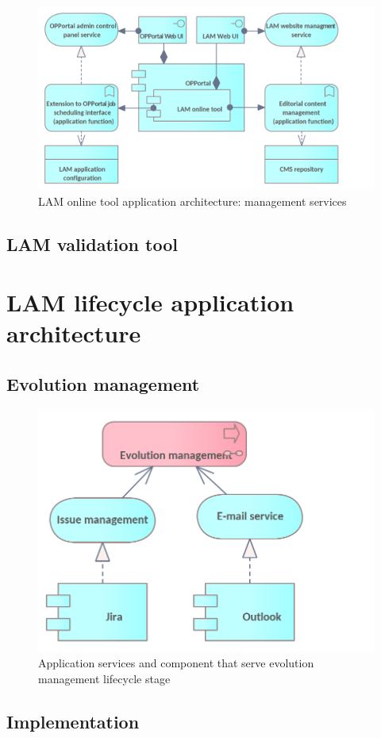 	
	

    \begin{figure}[!h]
	\centering
	\includegraphics[width=.7\textwidth]{images/application/Online tool - management.png}
	\caption{LAM online tool application architecture: management services}
	\label{fig:app-online-tool-management}
	\end{figure}
	
	\subsection{LAM validation tool}

	\section{LAM lifecycle application architecture}
	\label{sec:application-lifecycle}
	
	\subsection{Evolution management}

    \begin{figure}[!h]
		\centering
		\includegraphics[width=.5\textwidth]{images/application/lifecycle/Evolution.png}
		\caption{Application services and component that serve evolution management lifecycle stage}
		\label{fig:app-evolution-management}
	\end{figure}
	
	\subsection{Implementation}
	
